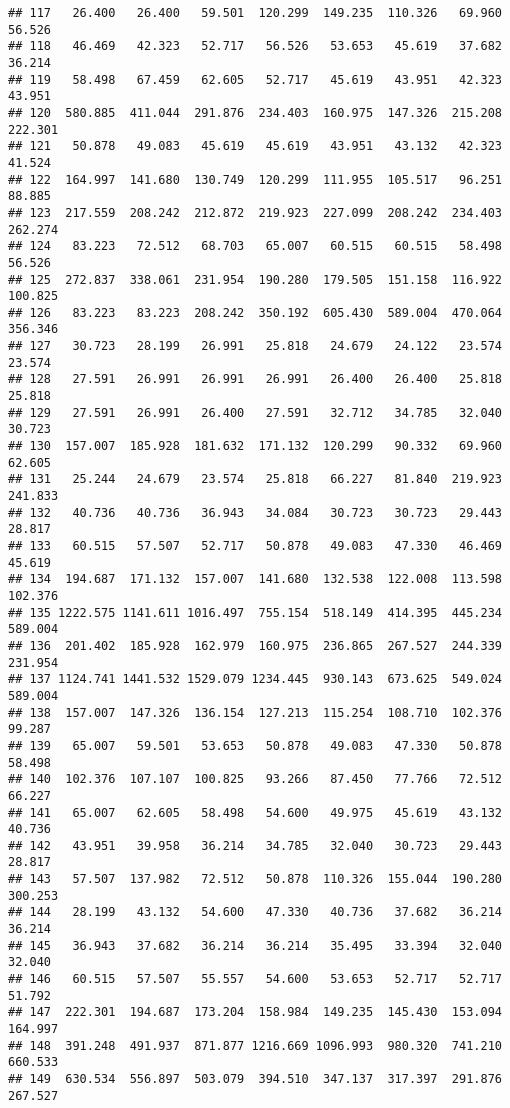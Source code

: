 \documentclass[
]{article}
\begin{document}
\begin{verbatim}
## 117   26.400   26.400   59.501  120.299  149.235  110.326   69.960   56.526
## 118   46.469   42.323   52.717   56.526   53.653   45.619   37.682   36.214
## 119   58.498   67.459   62.605   52.717   45.619   43.951   42.323   43.951
## 120  580.885  411.044  291.876  234.403  160.975  147.326  215.208  222.301
## 121   50.878   49.083   45.619   45.619   43.951   43.132   42.323   41.524
## 122  164.997  141.680  130.749  120.299  111.955  105.517   96.251   88.885
## 123  217.559  208.242  212.872  219.923  227.099  208.242  234.403  262.274
## 124   83.223   72.512   68.703   65.007   60.515   60.515   58.498   56.526
## 125  272.837  338.061  231.954  190.280  179.505  151.158  116.922  100.825
## 126   83.223   83.223  208.242  350.192  605.430  589.004  470.064  356.346
## 127   30.723   28.199   26.991   25.818   24.679   24.122   23.574   23.574
## 128   27.591   26.991   26.991   26.991   26.400   26.400   25.818   25.818
## 129   27.591   26.991   26.400   27.591   32.712   34.785   32.040   30.723
## 130  157.007  185.928  181.632  171.132  120.299   90.332   69.960   62.605
## 131   25.244   24.679   23.574   25.818   66.227   81.840  219.923  241.833
## 132   40.736   40.736   36.943   34.084   30.723   30.723   29.443   28.817
## 133   60.515   57.507   52.717   50.878   49.083   47.330   46.469   45.619
## 134  194.687  171.132  157.007  141.680  132.538  122.008  113.598  102.376
## 135 1222.575 1141.611 1016.497  755.154  518.149  414.395  445.234  589.004
## 136  201.402  185.928  162.979  160.975  236.865  267.527  244.339  231.954
## 137 1124.741 1441.532 1529.079 1234.445  930.143  673.625  549.024  589.004
## 138  157.007  147.326  136.154  127.213  115.254  108.710  102.376   99.287
## 139   65.007   59.501   53.653   50.878   49.083   47.330   50.878   58.498
## 140  102.376  107.107  100.825   93.266   87.450   77.766   72.512   66.227
## 141   65.007   62.605   58.498   54.600   49.975   45.619   43.132   40.736
## 142   43.951   39.958   36.214   34.785   32.040   30.723   29.443   28.817
## 143   57.507  137.982   72.512   50.878  110.326  155.044  190.280  300.253
## 144   28.199   43.132   54.600   47.330   40.736   37.682   36.214   36.214
## 145   36.943   37.682   36.214   36.214   35.495   33.394   32.040   32.040
## 146   60.515   57.507   55.557   54.600   53.653   52.717   52.717   51.792
## 147  222.301  194.687  173.204  158.984  149.235  145.430  153.094  164.997
## 148  391.248  491.937  871.877 1216.669 1096.993  980.320  741.210  660.533
## 149  630.534  556.897  503.079  394.510  347.137  317.397  291.876  267.527

\end{verbatim}
\end{document}
